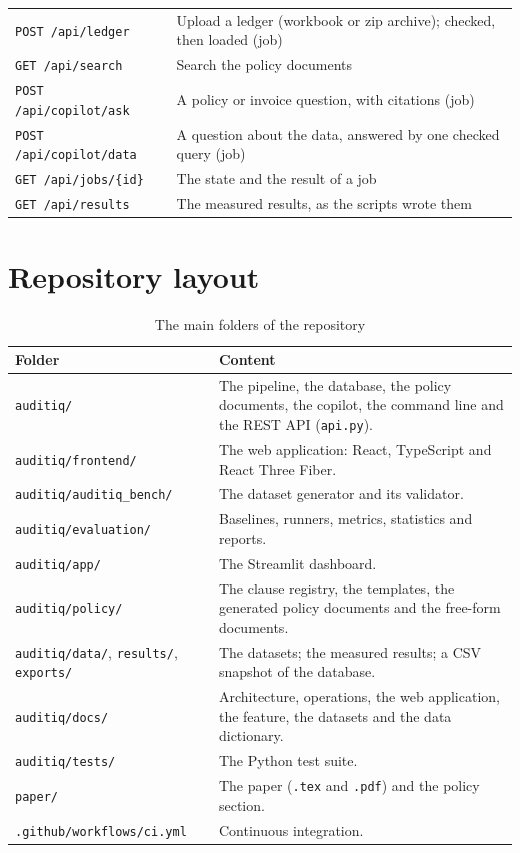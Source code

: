 \documentclass[11pt,a4paper]{article}
\begin{document}
\begin{table}[htbp]
\begin{tabular}{L{6.4cm}L{9.3cm}}
\texttt{POST /api/ledger} & Upload a ledger (workbook or zip archive); checked, then loaded (job) \\
\texttt{GET /api/search} & Search the policy documents \\
\texttt{POST /api/copilot/ask} & A policy or invoice question, with citations (job) \\
\texttt{POST /api/copilot/data} & A question about the data, answered by one checked query (job) \\
\texttt{GET /api/jobs/\{id\}} & The state and the result of a job \\
\texttt{GET /api/results} & The measured results, as the scripts wrote them \\
\bottomrule
\end{tabular}
\end{table}

\section{Repository layout}
\begin{table}[htbp]
\caption{The main folders of the repository}
\label{tab:layout}
\centering
\small
\begin{tabular}{L{4.5cm}L{11.2cm}}
\toprule
Folder & Content \\
\midrule
\texttt{auditiq/} & The pipeline, the database, the policy documents, the copilot, the command line and the REST API (\texttt{api.py}). \\
\texttt{auditiq/frontend/} & The web application: React, TypeScript and React Three Fiber. \\
\texttt{auditiq/auditiq\_bench/} & The dataset generator and its validator. \\
\texttt{auditiq/evaluation/} & Baselines, runners, metrics, statistics and reports. \\
\texttt{auditiq/app/} & The Streamlit dashboard. \\
\texttt{auditiq/policy/} & The clause registry, the templates, the generated policy documents and the free-form documents. \\
\texttt{auditiq/data/}, \texttt{results/}, \texttt{exports/} & The datasets; the measured results; a CSV snapshot of the database. \\
\texttt{auditiq/docs/} & Architecture, operations, the web application, the feature, the datasets and the data dictionary. \\
\texttt{auditiq/tests/} & The Python test suite. \\
\texttt{paper/} & The paper (\texttt{.tex} and \texttt{.pdf}) and the policy section. \\
\texttt{.github/workflows/ci.yml} & Continuous integration. \\
\bottomrule
\end{tabular}
\end{table}
\end{document}
